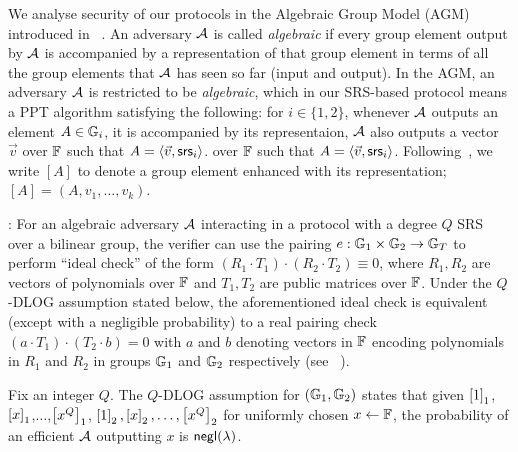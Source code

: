 We analyse security of our protocols in the Algebraic Group Model (AGM) introduced
in ~\cite{C:FucKilLos18}. An adversary $\mathcal{A}$ is called \textit{algebraic} if every group element output by $\mathcal{A}$ is accompanied by a representation of that group element in terms of all the group elements that $\mathcal{A}$ has seen so far (input and output).
In the AGM, an adversary $\mathcal{A}$ is restricted to be {\em algebraic}, which in our SRS-based protocol means a PPT algorithm satisfying the following:
for $i\in \{1,2\}$, whenever $\mathcal{A}$ outputs an element $A\in \mathbb{G}_i$, it is accompanied by its representaion, $\mathcal{A}$ also outputs a vector $\vec{v}$
	over $\mathbb{F}$ such that $A=\langle \vec{v},\mathsf{srs}_i\rangle$.
	over $\mathbb{F}$ such that $A=\langle \vec{v},\mathsf{srs}_i\rangle$.
Following~\cite{C:FucKilLos18}, we write $[A]$ to denote a group element enhanced with its representation; $[A] = (A,v_1,\ldots,v_k)$.

: For an algebraic adversary $\mathcal{A}$ interacting in a protocol with a degree $Q$ SRS over a bilinear group, the verifier
can use the pairing $e:\mathbb{G}_1\times \mathbb{G}_2\rightarrow \mathbb{G}_T$ to perform ``ideal check'' of the form $(R_1\cdot T_1)\cdot (R_2\cdot T_2)\equiv 0$, where $R_1,R_2$ are
vectors of polynomials over $\mathbb{F}$ and $T_1, T_2$ are public matrices over $\mathbb{F}$.
Under the $Q$-DLOG assumption stated below, the aforementioned ideal check
is equivalent (except with a negligible probability) to a real pairing check $(a\cdot T_1)\cdot (T_2\cdot b)=0$ with $a$ and $b$ denoting vectors in $\mathbb{F}$ encoding polynomials in $R_1$ and $R_2$ in
groups $\mathbb{G}_1$ and $\mathbb{G}_2$ respectively (see ~\cite[Lemma 2.2]{Gabizon2019PLONKPO}).
\begin{definition}\label{defn:q-dlog}
Fix an integer $Q$. The $Q$-DLOG assumption for $(\mathbb{G}_1,\mathbb{G}_2)$ states that given $\left[{1}\right]_1$,$\left[{x}\right]_1$,$\ldots$,$\left[{x^Q}\right]_1$, $\left[{1}\right]_2,\left[{x}\right]_2,\ldots,\left[{x^Q}\right]_2$ for
uniformly chosen $x\gets \mathbb{F}$, the probability of an efficient $\mathcal{A}$ outputting $x$ is $\mathsf{negl}(\lambda)$.
\end{definition}


